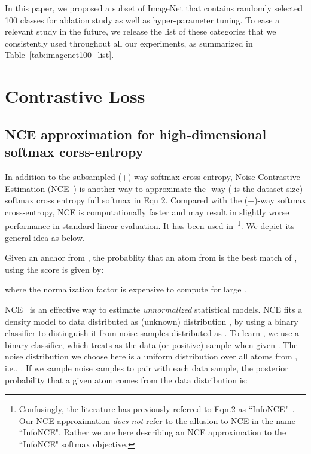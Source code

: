 \documentclass[10pt,twocolumn,letterpaper]{article}
\newcommand{\citep}[1]{\cite{#1}}
\begin{document}
\begin{table}[t]
\begin{center}
\begin{small}
\begin{tabular}{ccccc}
\bottomrule
\end{tabular}
\end{small}
\end{center}
\vskip -0.1in
\vspace{-5pt}
\end{table} In this paper, we proposed a subset of ImageNet that contains randomly selected 100 classes for ablation study as well as hyper-parameter tuning. To ease a relevant study in the future, we release the list of these categories that we consistently used throughout all our experiments, as summarized in Table~\ref{tab:imagenet100_list}.

\section{Contrastive Loss}

\subsection{NCE approximation for high-dimensional softmax corss-entropy}

In addition to the subsampled (+)-way softmax cross-entropy, Noise-Contrastive Estimation (NCE~\citep{gutmann2010noise}) is another way to approximate the -way ( is the dataset size) softmax cross entropy full softmax in Eqn 2. Compared with the (+)-way softmax cross-entropy, NCE is computationally faster and may result in slightly worse performance in standard linear evaluation. It has been used in~\cite{mnih2013learning,wu2018unsupervised}\footnote{Confusingly, the literature has previously referred to Eqn.2 as ``InfoNCE"~\citep{oord2018representation}. Our NCE approximation \emph{does not} refer to the allusion to NCE in the name ``InfoNCE". Rather we are here describing an NCE approximation to the ``InfoNCE" softmax objective.}. We depict its general idea as below.

Given an anchor  from , the probablity that an atom  from  is the best match of , using the score  is given by:

where the normalization factor  is expensive to compute for large . 

NCE~\citep{gutmann2010noise} is an effective way to estimate \emph{unnormalized} statistical models. NCE fits a density model  to data distributed as (unknown) distribution , by using a binary classifier to distinguish it from noise samples distributed as . To learn , we use a binary classifier, which treats  as the data (or positive) sample when given . The noise distribution  we choose here is a uniform distribution over all atoms from , i.e., . If we sample  noise samples to pair with each data sample, the posterior probability that a given atom  comes from the data distribution is: 
\end{document}
